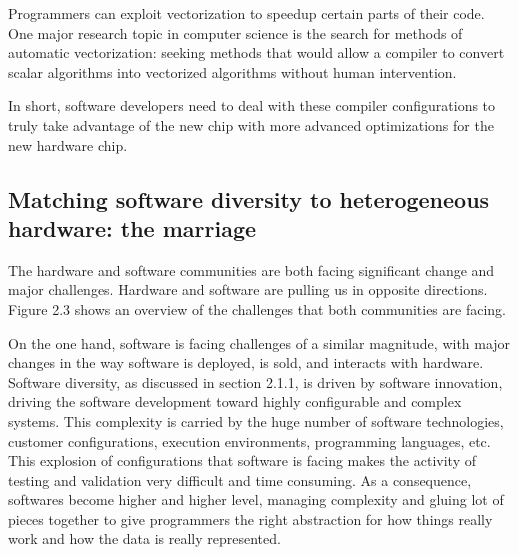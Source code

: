 Programmers can exploit vectorization to speedup certain parts of their code. One major research topic in computer science is the search for methods of automatic vectorization: seeking methods that would allow a compiler to convert scalar algorithms into vectorized algorithms without human intervention.

In short, software developers need to deal with these compiler configurations to truly take advantage of the new chip with more advanced optimizations for the new hardware chip.









\subsection{Matching software diversity to heterogeneous hardware: the marriage}
The hardware and software communities are both facing significant change and major challenges. Hardware and software are pulling us in opposite directions. Figure 2.3 shows an overview of the challenges that both communities are facing.  

On the one hand, software is facing challenges of a similar magnitude, with major changes in the way software is deployed, is sold, and interacts with hardware. 
Software diversity, as discussed in section 2.1.1, is driven by software innovation, driving the software development toward highly configurable and complex systems. This complexity is carried by the huge number of software technologies, customer configurations, execution environments, programming languages, etc. This explosion of configurations that software is facing makes the activity of testing and validation very difficult and time consuming. 
As a consequence, softwares become higher and higher level, managing complexity and gluing lot of pieces together to give programmers the right abstraction for how things really work and how the data is really represented. 

